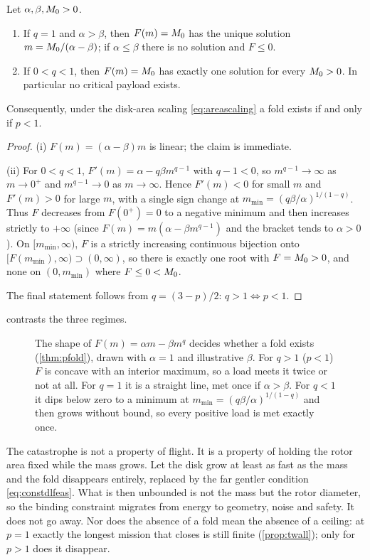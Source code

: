 \begin{theorem}
\label{thm:pfold}
Let $\alpha,\beta,M_0>0$.
\begin{enumerate}[label=(\roman*),nosep]
  \item If $q=1$ and $\alpha>\beta$, then $F(m)=M_0$ has the unique solution
        $m=M_0/(\alpha-\beta)$; if $\alpha\le\beta$ there is no solution and
        $F\le 0$.
  \item If $0<q<1$, then $F(m)=M_0$ has exactly one solution for every
        $M_0>0$. In particular no critical payload exists.
\end{enumerate}
Consequently, under the disk-area scaling \cref{eq:areascaling} a fold exists
if and only if $p<1$.
\end{theorem}

\begin{proof}
(i) $F(m)=(\alpha-\beta)m$ is linear; the claim is immediate.

(ii) For $0<q<1$, $F'(m)=\alpha-q\beta m^{q-1}$ with $q-1<0$, so
$m^{q-1}\to\infty$ as $m\to0^+$ and $m^{q-1}\to0$ as $m\to\infty$. Hence
$F'(m)<0$ for small $m$ and $F'(m)>0$ for large $m$, with a single sign change
at $m_{\min}=(q\beta/\alpha)^{1/(1-q)}$. Thus $F$ decreases from $F(0^+)=0$ to
a negative minimum and then increases strictly to $+\infty$ (since
$F(m)=m(\alpha-\beta m^{q-1})$ and the bracket tends to $\alpha>0$). On
$[m_{\min},\infty)$, $F$ is a strictly increasing continuous bijection onto
$[F(m_{\min}),\infty)\supset(0,\infty)$, so there is exactly one root with
$F=M_0>0$, and none on $(0,m_{\min})$ where $F\le0<M_0$.

The final statement follows from $q=(3-p)/2$: $q>1 \iff p<1$.
\end{proof}

 contrasts the three regimes.

\begin{figure}[tbp]
\centering

\caption{The shape of $F(m)=\alpha m-\beta m^q$ decides whether a fold exists
(\cref{thm:pfold}), drawn with $\alpha=1$ and illustrative $\beta$. For $q>1$
($p<1$) $F$ is concave with an interior maximum, so a load meets it twice or
not at all. For $q=1$ it is a straight line, met once if $\alpha>\beta$. For
$q<1$ it dips below zero to a minimum at $m_{\min}=(q\beta/\alpha)^{1/(1-q)}$
and then grows without bound, so every positive load is met exactly once.}
\label{fig:qshapes}
\end{figure}

\begin{finding}
The catastrophe is not a property of flight. It is a property of holding the
rotor area fixed while the mass grows. Let the disk grow at least as fast as
the mass and the fold disappears entirely, replaced by the far gentler
condition \cref{eq:constdlfeas}. What is then unbounded is not the mass but the
rotor diameter, so the binding constraint migrates from energy to geometry,
noise and safety. It does not go away. Nor does the absence of a fold mean the
absence of a ceiling: at $p=1$ exactly the longest mission that closes is still
finite (\cref{prop:twall}); only for $p>1$ does it disappear.
\end{finding}
